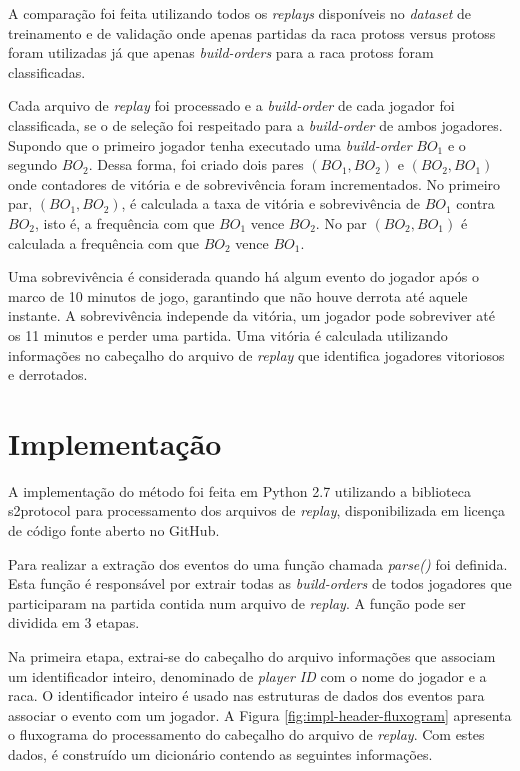 A comparação foi feita utilizando todos os \textit{\glspl{replay}} disponíveis no \textit{dataset} de treinamento e de validação onde apenas partidas da \gls{raca} \gls{protoss} versus \gls{protoss} foram utilizadas já que apenas \textit{\glspl{build-order}} para a \gls{raca} \gls{protoss} foram classificadas.

Cada arquivo de \textit{\gls{replay}} foi processado e a \textit{\gls{build-order}} de cada jogador foi classificada, se o  de seleção foi respeitado para a \textit{\gls{build-order}} de ambos jogadores. Supondo que o primeiro jogador tenha executado uma \textit{\gls{build-order}} $BO_1$ e o segundo $BO_2$. Dessa forma, foi criado dois pares $(BO_1, BO_2)$ e $(BO_2, BO_1)$ onde contadores de vitória e de sobrevivência foram incrementados. No primeiro par, $(BO_1, BO_2)$, é calculada a taxa de vitória e sobrevivência de $BO_1$ contra $BO_2$, isto é, a frequência com que $BO_1$ vence $BO_2$. No par $(BO_2, BO_1)$ é calculada a frequência com que $BO_2$ vence $BO_1$.

Uma sobrevivência é considerada quando há algum evento do jogador após o marco de 10 minutos de jogo, garantindo que não houve derrota até aquele instante. A sobrevivência independe da vitória, um jogador pode sobreviver até os 11 minutos e perder uma partida. Uma vitória é calculada utilizando informações no cabeçalho do arquivo de \textit{\gls{replay}} que identifica jogadores vitoriosos e derrotados.
 
		\section{Implementação}

A implementação do método foi feita em Python 2.7 utilizando a biblioteca s2protocol \cite{s2protocol} para processamento dos arquivos de \textit{\gls{replay}}, disponibilizada em licença de código fonte aberto no GitHub.

Para realizar a extração dos eventos do uma função chamada \textit{\textit{parse()}} foi definida. Esta função é responsável por extrair todas as \textit{\glspl{build-order}} de todos jogadores que participaram na partida contida num arquivo de \textit{\gls{replay}}. A função pode ser dividida em 3 etapas.

Na primeira etapa, extrai-se do cabeçalho do arquivo informações que associam um identificador inteiro, denominado de \textit{player ID} com o nome do jogador e a \gls{raca}. O identificador inteiro é usado nas estruturas de dados dos eventos para associar o evento com um jogador. A Figura \ref{fig:impl-header-fluxogram} apresenta o fluxograma do processamento do cabeçalho do arquivo de \textit{\gls{replay}}. Com estes dados, é construído um dicionário contendo as seguintes informações.

